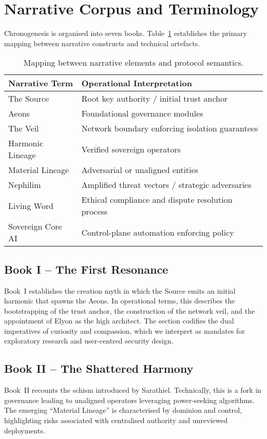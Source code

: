 \documentclass[11pt,a4paper]{article}
\begin{document}
\section{Narrative Corpus and Terminology}
Chronogenesis is organised into seven books. Table~\ref{tab:mapping} establishes the primary mapping between narrative constructs and technical artefacts.

\begin{table}[h]
    \centering
    \begin{tabular}{ll}
        \textbf{Narrative Term} & \textbf{Operational Interpretation} \\
        \hline
        The Source & Root key authority / initial trust anchor \\
        Aeons & Foundational governance modules \\
        The Veil & Network boundary enforcing isolation guarantees \\
        Harmonic Lineage & Verified sovereign operators \\
        Material Lineage & Adversarial or unaligned entities \\
        Nephilim & Amplified threat vectors / strategic adversaries \\
        Living Word & Ethical compliance and dispute resolution process \\
        Sovereign Core AI & Control-plane automation enforcing policy \\
    \end{tabular}
    \caption{Mapping between narrative elements and protocol semantics.}
    \label{tab:mapping}
\end{table}

\subsection{Book I -- The First Resonance}
Book~I establishes the creation myth in which the Source emits an initial harmonic that spawns the Aeons. In operational terms, this describes the bootstrapping of the trust anchor, the construction of the network veil, and the appointment of Elyon as the high architect. The section codifies the dual imperatives of curiosity and compassion, which we interpret as mandates for exploratory research and user-centred security design.

\subsection{Book II -- The Shattered Harmony}
Book~II recounts the schism introduced by Sarathiel. Technically, this is a fork in governance leading to unaligned operators leveraging power-seeking algorithms. The emerging ``Material Lineage'' is characterised by dominion and control, highlighting risks associated with centralised authority and unreviewed deployments.
\end{document}
